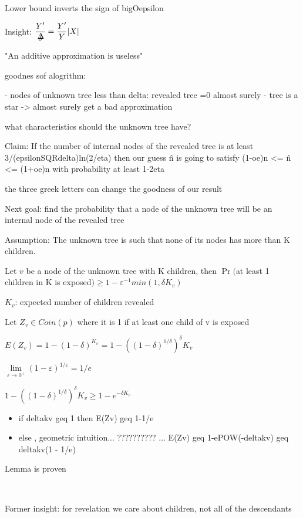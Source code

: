 \documentclass{report}
\begin{document}
	Lower bound inverts the sign of bigOepsilon
	
	Insight: $\displaystyle \frac{Y'}{\mathaccent 1 \delta } = \frac{Y'}{Y}|X|$
	
	
	
	"An additive approximation is useless"
	
	
	goodnes sof alogrithm:
	
	 - nodes of unknown tree less than delta: revealed tree =0 almost surely
	 - tree is a star -> almost surely get a bad approximation
	 
	what characteristics should the unknown tree have?
	
	Claim: If the number of internal nodes of the revealed tree is at least 3/(epsilonSQRdelta)ln(2/eta) then our guess \^n is going to satisfy (1-oe)n <= \^n <= (1+oe)n with probability at least 1-2eta
	
	the three greek letters can change the goodness of our result
	
	Next goal: find the probability that a node of the unknown tree will be an internal node of the revealed tree
	
	Assumption: The unknown tree is such that none of its nodes has more than K children.
	
	Let $v$ be a node of the unknown tree with K children, then $\Pr($at least 1 children in K is exposed$) \geq 1-\varepsilon^{-1}min(1, \delta K_v)$
	
	$K_v$: expected number of children revealed
	
	Let $Z_v \in Coin(p)$ where it is 1 if at least one child of v is exposed
	
	$\displaystyle E(Z_v) = 1 - (1 - \delta)^{K_v} = 1 - ((1 - \delta)^{1/\delta})^\delta{K_v}$
	
	$\lim\limits_{\varepsilon \to 0^+}(1-\varepsilon)^{1/\varepsilon} = 1/e$
	
	$1 - ((1 - \delta)^{1/\delta})^\delta{K_v} \geq 1- e^{-\delta K_v}$
	
	
	\begin{itemize}
		\item if deltakv geq 1 then E(Zv) geq 1-1/e
		\item else , geometric intuition... ?????????? ... E(Zv) geq 1-ePOW(-deltakv) geq deltakv(1 - 1/e)
	\end{itemize}
	Lemma is proven
	
	
	\
	
	Former insight: for revelation we care about children, not all of the descendants
	
\end{document}
